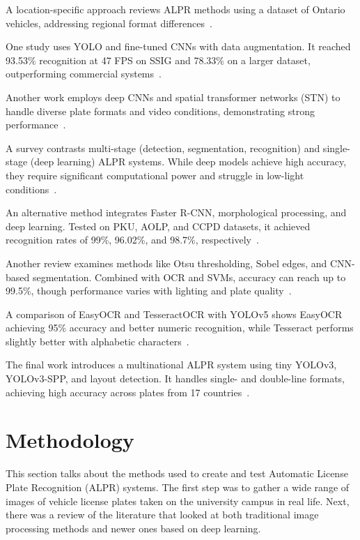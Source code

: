 \documentclass[runningheads]{llncs}
\begin{document}
A location-specific approach reviews ALPR methods using a dataset of Ontario vehicles, addressing regional format differences~\cite{ahmad2015automatic}.

One study uses YOLO and fine-tuned CNNs with data augmentation. It reached 93.53\% recognition at 47 FPS on SSIG and 78.33\% on a larger dataset, outperforming commercial systems~\cite{laroca2018robust}.

Another work employs deep CNNs and spatial transformer networks (STN) to handle diverse plate formats and video conditions, demonstrating strong performance~\cite{jain2016deep}.

A survey contrasts multi-stage (detection, segmentation, recognition) and single-stage (deep learning) ALPR systems. While deep models achieve high accuracy, they require significant computational power and struggle in low-light conditions~\cite{9310202}.

An alternative method integrates Faster R-CNN, morphological processing, and deep learning. Tested on PKU, AOLP, and CCPD datasets, it achieved recognition rates of 99\%, 96.02\%, and 98.7\%, respectively~\cite{app13063956}.

Another review examines methods like Otsu thresholding, Sobel edges, and CNN-based segmentation. Combined with OCR and SVMs, accuracy can reach up to 99.5\%, though performance varies with lighting and plate quality~\cite{s21093028}.

A comparison of EasyOCR and TesseractOCR with YOLOv5 shows EasyOCR achieving 95\% accuracy and better numeric recognition, while Tesseract performs slightly better with alphabetic characters~\cite{10009215}.

The final work introduces a multinational ALPR system using tiny YOLOv3, YOLOv3-SPP, and layout detection. It handles single- and double-line formats, achieving high accuracy across plates from 17 countries~\cite{9003211}.


\section{Methodology}
\label{sec:methodology}
This section talks about the methods used to create and test Automatic License Plate Recognition (ALPR) systems. The first step was to gather a wide range of images of vehicle license plates taken on the university campus in real life. Next, there was a review of the literature that looked at both traditional image processing methods and newer ones based on deep learning.
\end{document}
